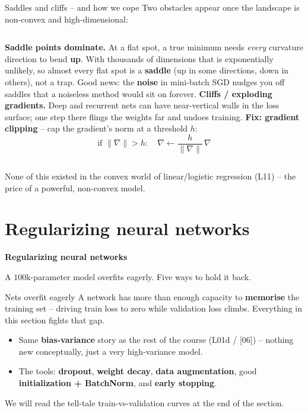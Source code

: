 \documentclass[aspectratio=169]{beamer}
\begin{document}
\begin{frame}{Saddles and cliffs -- and how we cope}
  Two obstacles appear once the landscape is non-convex and high-dimensional:
  \vfill
  \begin{columns}[T]
    \textbf{Saddle points dominate.} At a flat spot, a true minimum needs \emph{every}
    curvature direction to bend \textbf{up}. With thousands of dimensions that is exponentially
    unlikely, so almost every flat spot is a \textbf{saddle} (up in some directions, down in
    others), not a trap.
    \vskip 3pt
    \footnotesize Good news: the \textbf{noise} in mini-batch SGD nudges you off saddles that a
    noiseless method would sit on forever.
    \textbf{Cliffs / exploding gradients.} Deep and recurrent nets can have near-vertical walls
    in the loss surface; one step there flings the weights far and undoes training.
    \vskip 3pt
    \textbf{Fix: gradient clipping} -- cap the gradient's norm at a threshold $h$:
    \[
      \text{if } \|\nabla\| > h:\quad \nabla \leftarrow \frac{h}{\|\nabla\|}\,\nabla
    \]
  \end{columns}
  \vfill
  \footnotesize None of this existed in the convex world of linear/logistic regression (L11) --
  the price of a powerful, non-convex model.
\end{frame}

\section{Regularizing neural networks}

\begin{frame}[plain]
  \vfill
  \begin{center}
    {\Large\color{popblue}\textbf{Regularizing neural networks}}\\[0.9em]
    \begin{minipage}{0.82\textwidth}\centering\small
      A $100$k-parameter model overfits eagerly. Five ways to hold it back.
    \end{minipage}
  \end{center}
  \vfill
\end{frame}

\begin{frame}{Nets overfit eagerly}
  A network has more than enough capacity to \textbf{memorise} the training set -- driving
  train loss to zero while validation loss climbs. Everything in this section fights that gap.
  \vfill
  \begin{itemize}\small
    \item Same \textbf{bias-variance} story as the rest of the course (L01d / [06]) -- nothing
      new conceptually, just a very high-variance model.
    \item The tools: \textbf{dropout}, \textbf{weight decay}, \textbf{data augmentation},
      good \textbf{initialization + BatchNorm}, and \textbf{early stopping}.
  \end{itemize}
  \vfill
  \footnotesize We will read the tell-tale train-vs-validation curves at the end of the section.
\end{frame}
\end{document}
